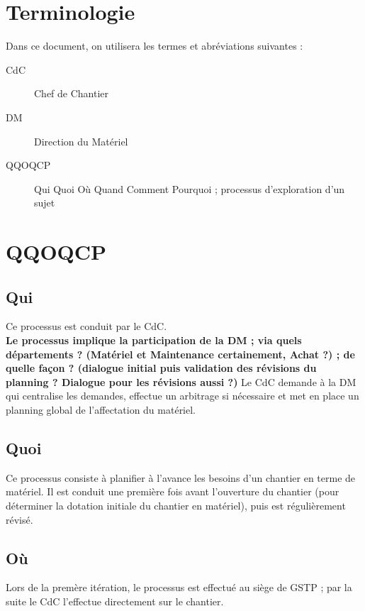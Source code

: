 \documentclass[a4paper]{article}
\begin{document}
\maketitle

\section{Terminologie}
Dans ce document, on utilisera les termes et abréviations suivantes :

\begin{description}
\item[CdC] Chef de Chantier
\item[DM] Direction du Matériel
\item[QQOQCP] Qui Quoi Où Quand Comment Pourquoi ; processus
d'exploration d'un sujet
\end{description}

\section{QQOQCP}

\subsection*{Qui}
Ce processus est conduit par le CdC.\\
\textbf{Le processus implique la participation de la DM ;
via quels départements ? (Matériel et Maintenance certainement, Achat ?) ;
de quelle façon ? (dialogue initial puis validation des révisions du
planning ? Dialogue pour les révisions aussi ?)}
Le CdC demande à la DM qui centralise les demandes, effectue un arbitrage
si nécessaire et met en place un planning global de l'affectation du
matériel.

\subsection*{Quoi}
Ce processus consiste à planifier à l'avance les besoins d'un chantier en
terme de matériel. Il est conduit une première fois avant l'ouverture du
chantier (pour déterminer la dotation initiale du chantier en matériel),
puis est régulièrement révisé.

\subsection*{Où}
Lors de la premère itération, le processus est effectué au siège de GSTP ;
par la suite le CdC l'effectue directement sur le chantier.
\end{document}
